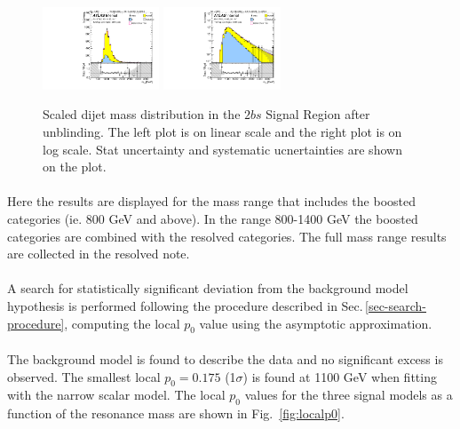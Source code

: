 \begin{figure}[htbp!]
\begin{center}
\includegraphics[width=0.31\textwidth,angle=-90]{figures/boosted/Signal_Syst/Moriond_bkg_9_TwoTag_split_Signal_mHH_pole.pdf}
\includegraphics[width=0.31\textwidth,angle=-90]{figures/boosted/Signal_Syst/Moriond_bkg_9_TwoTag_split_Signal_mHH_pole_1.pdf}  
  \caption{Scaled dijet mass distribution in the $2bs$ Signal Region after unblinding. The left plot is on linear scale and the right plot is on log scale. Stat uncertainty and systematic ucnertainties are shown on the plot.}
  \label{fig:boosted-2b-signal-pole}
\end{center}
\end{figure}

\paragraph{}
Here the results are displayed for the mass range that includes the boosted categories (ie. 800 GeV and above).  In the range 800-1400 GeV the boosted categories are combined with the resolved categories. The full mass range results are collected in the resolved note.

\paragraph{}
A search for statistically significant deviation from the background model hypothesis is performed following the procedure described in Sec.\,\ref{sec-search-procedure}, computing the local $p_0$ value using the asymptotic approximation.

\paragraph{}
The background model is found to describe the data and no significant excess is observed. The smallest local $p_0=0.175$ (1$\sigma$) is found at 1100 GeV when fitting with the narrow scalar model. The local $p_0$ values for the three signal models as a function of the resonance mass are shown in Fig.~\ref{fig:localp0}.

